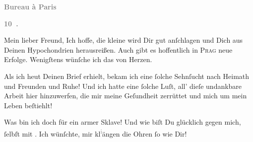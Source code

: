 \pstart
           \begin{otherlanguage}{french}\textcolor{gray}{\textbf{\textbf{Bureau à Paris}}}\end{otherlanguage}\pend
           
\pstart
           \begin{otherlanguage}{french}\textcolor{gray}{\textbf{\textbf{10 .}}}\end{otherlanguage}\pend
           
\pstart\center{}Mein lieber Freund,\pend\vspace{0.5em}
\pstart
           Ich hoffe, die kleine \label{K_L02832-1v}\label{K_L02832-1} wird Dir gut
               anſchlagen und Dich aus Deinen Hypochondrien herausreißen. Auch gibt es hoffentlich
               in \textsc{Prag} neue Erfolge. Wenigſtens wünſche ich das von Herzen.\pend
           
\pstart
           Als ich heut Deinen Brief erhielt, bekam ich eine  ſolche Sehnſucht nach Heimath und Freunden und Ruhe!
               Und ich hatte eine ſolche Luſt, all’ dieſe undankbare Arbeit hier hinzuwerfen, die
               mir meine Geſundheit zerrüttet und mich um mein Leben beſtiehlt!\pend
           
\pstart
           {\pb}Was bin ich doch für ein armer Sklave! Und wie biſt
               Du glücklich gegen mich, ſelbſt mit \label{K_L02832-2v}\label{K_L02832-2}. Ich wünſchte, mir kl\substVorne{}\textsuperscript{\textcolor{gray}{i}}\substDazwischen{}ä\substHinten{}ngen die Ohren ſo wie Dir!\pend
           
